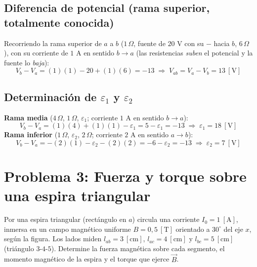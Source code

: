 \documentclass[12pt,letterpaper]{article}
\begin{document}
\subsection*{Diferencia de potencial (rama superior, totalmente conocida)}
Recorriendo la rama superior de $a$ a $b$ ($1\,\Omega$, fuente de $20$ V con su $-$ hacia $b$,
$6\,\Omega$), con su corriente de $1$ A en sentido $b\to a$ (las resistencias \emph{suben} el
potencial y la fuente lo \emph{baja}):
\[
    V_b - V_a = (1)(1) - 20 + (1)(6) = -13
    \;\Rightarrow\; \boxed{V_{ab} = V_a - V_b = 13\ [\text{V}]}
\]

\subsection*{Determinaci\'on de $\varepsilon_1$ y $\varepsilon_2$}
\textbf{Rama media} ($4\,\Omega$, $1\,\Omega$, $\varepsilon_1$; corriente $1$ A en sentido $b\to a$):
\[
    V_b - V_a = (1)(4) + (1)(1) - \varepsilon_1 = 5 - \varepsilon_1 = -13
    \;\Rightarrow\; \boxed{\varepsilon_1 = 18\ [\text{V}]}
\]
\textbf{Rama inferior} ($1\,\Omega$, $\varepsilon_2$, $2\,\Omega$; corriente $2$ A en sentido $a\to b$):
\[
    V_b - V_a = -(2)(1) - \varepsilon_2 - (2)(2) = -6 - \varepsilon_2 = -13
    \;\Rightarrow\; \boxed{\varepsilon_2 = 7\ [\text{V}]}
\]

\newpage

\section*{Problema 3: Fuerza y torque sobre una espira triangular}

\noindent Por una espira triangular (rect\'angulo en $a$) circula una corriente
$I_0 = 1\ [\text{A}]$, inmersa en un campo magn\'etico uniforme $B = 0{,}5\ [\text{T}]$
orientado a $30^\circ$ del eje $x$, seg\'un la figura. Los lados miden
$l_{ab} = 3\ [\text{cm}]$, $l_{ac} = 4\ [\text{cm}]$ y $l_{bc} = 5\ [\text{cm}]$ (tri\'angulo
$3$-$4$-$5$). Determine la fuerza magn\'etica sobre cada segmento, el momento magn\'etico de la
espira y el torque que ejerce $\vec{B}$.

\medskip
\end{document}
